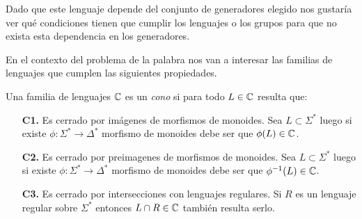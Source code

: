 \documentclass[tesis.tex]{subfiles}
\begin{document}
Dado que este lenguaje depende del conjunto de generadores elegido nos gustaría ver qué condiciones tienen que cumplir los lenguajes o los grupos para que no exista esta dependencia en los generadores.


En el contexto del problema de la palabra nos van a interesar las familias de lenguajes que cumplen las siguientes propiedades.
\medskip
\begin{deff}
	Una familia de lenguajes $\mathbb{C}$ es un \emph{cono} si para todo $L \in \mathbb{C}$ resulta que:
	\begin{itemize}
		\item[\textbf{C1.}] Es cerrado por imágenes de morfismos de monoides. Sea $L \subset \Sigma^*$ luego si existe $\phi:\Sigma^* \to \Delta^*$ morfismo de monoides debe ser que $\phi(L) \in \mathbb{C}$.
		\item[\textbf{C2.}] Es cerrado por preimagenes de morfismos de monoides. Sea $L \subset \Sigma^*$ luego si existe $\phi:\Sigma^* \to \Delta^*$ morfismo de monoides  debe ser que $\phi^{-1}(L) \in \mathbb{C}$. 
		\item[\textbf{C3.}] Es cerrado por intersecciones con lenguajes regulares. Si $R$ es un lenguaje regular sobre $\Sigma^*$ entonces $L \cap R \in \mathbb{C}$ también resulta serlo.
	\end{itemize}
\end{deff} 
\end{document}
